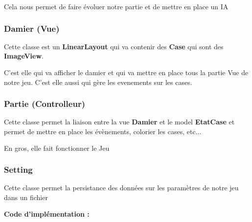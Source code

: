 \documentclass{article}
\begin{document}
  Cela nous permet de faire évoluer notre partie et de mettre en place un IA
  
  \subsubsection{Damier (Vue)}
  
  Cette classe est un \textbf{LinearLayout} qui va contenir des \textbf{Case} 
  qui sont des \textbf{ImageView}.

  C'est elle qui va afficher le damier et qui va mettre en place tous la partie Vue 
  de notre jeu. 
  C'est elle aussi qui gère les evenements sur les cases.

  \subsubsection{Partie (Controlleur)}
  
  Cette classe permet la liaison entre la vue \textbf{Damier} et le model \textbf{EtatCase}
  et permet de mettre en place les évènements, colorier les cases, etc... 

  En gros, elle fait fonctionner le Jeu

  \subsubsection{Setting}

  Cette classe permet la persistance des données sur les paramètres de notre jeu dans un fichier

  \textbf{Code d'implémentation : }
\end{document}
